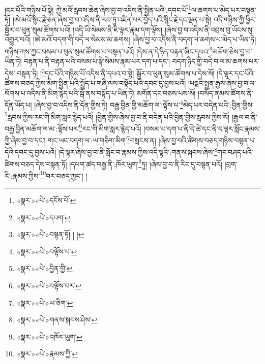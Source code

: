 །དང་པོའི་གཉིས་པོ་སྟེ། ཀྱེ་མའོ་རླབས་ཆེན་ཞེས་བྱ་བ་འདིས་ནི་སྦྱིན་པའི་:དབང་པོ་\footnote{«སྣར་»«པེ་»དངོས་པོ་}ལ་ཆགས་པ་མེད་པར་བསྟན་ཏོ། །ཨེ་མའོ་སྙིང་རྗེ་ཅན་ཞེས་བྱ་བ་འདིས་ནི་རབ་ཏུ་འཛིན་པར་བྱེད་པའི་སྙིང་རྗེ་དང་ལྡན་པ་སྟེ། འདི་གཉིས་ཀྱི་ཕྱིར་སྦྱོར་བ་ཕུན་སུམ་ཚོགས་པའོ། །འདི་ཡི་སེམས་ནི་ཇི་ལྟར་རྣམ་དག་ལྟོས། །ཞེས་བྱ་བ་འདིས་ནི་འབྲས་བུ་ཡོངས་སུ་འགྱུར་བའོ། །ཨེ་མའོ་བདག་གི་བདེ་ལ་སེམས་མ་ཆགས། །ཞེས་བྱ་བ་འདིས་ནི་བདག་ལ་ཆགས་པ་མེད་པ་ཡིན་ཏེ། གཉིས་ཀས་ཀྱང་བསམ་པ་ཕུན་སུམ་ཚོགས་པ་བསྟན་པའོ། །དེས་ན་དེ་ཉིད་བརྟན་ཞིང་དཔའ་\footnote{«སྣར་»«པེ་»དཔག་}མཆོག་ཅེས་བྱ་བ་ཡིན་ཏེ། བརྟན་པ་ནི་བརྟན་པའི་བསམ་པ་སྟེ་སེམས་རྣམ་པར་དག་པ་དང་། བདག་ཉིད་གྱི་བདེ་བ་ལ་མ་ཆགས་པར་དེས་:བསྟན་ཏེ། །\footnote{«སྣར་»«པེ་»བསྟན་ཏོ། ། །}དང་པོའི་གཉིས་པོ་འདིས་ནི་དཔའ་བ་སྟེ། སྦྱོར་བ་ཕུན་སུམ་ཚོགས་པ་དེས་སོ། །དེ་ལྟར་དང་པོའི་ཚིགས་བཅད་ཀྱིས་མིག་སྦྱིན་པའི་སྤྱོད་པ་གཞི་ལས་བསྟོད་པའི་དབང་དུ་བྱས་པའོ། །པདྨའི་སྤྱན་རྒྱས་ཞེས་བྱ་བ་ལ་སོགས་པ་འདིས་ནི་མིག་རྙེད་པའི་སྒོ་ནས་བསྟོད་པ་ཡིན་ཏེ། མགོན་དང་བཅས་པས་སོ། །བསོད་ནམས་ཚོགས་ནི་དོན་ཡོད་པ། །ཞེས་བྱ་བ་འདིས་ནི་དོན་གྱིས་ཏེ། བརྒྱ་བྱིན་གྱི་མཆོག་ལ་:ལྟོས་པ་\footnote{«སྣར་»«པེ་»བལྟོས་པ་}མེད་པར་བདེན་པའི་:བྱིན་གྱིས་\footnote{«སྣར་»«པེ་»བྱིན་གྱི་}རླབས་ཀྱིས་རང་གི་མིག་སླར་རྙེད་པའོ། །བྱིན་གྱིས་ཞེས་བྱ་བ་ནི་བདེན་པའི་བྱིན་གྱིས་རླབས་ཀྱིས་སོ། །རྒྱལ་བ་ནི་བརྒྱ་བྱིན་མཆོག་ལ་མ་:ལྟོས་པར་\footnote{«སྣར་»«པེ་»བལྟོས་པར་}རང་གི་མིག་སླར་རྙེད་པའོ། །བསམ་པ་དག་པ་ནི་དེ་ཚེ་དང་ནི་ད་ལྟར་སློང་རྣམས་ཀྱི་ཞེས་བྱ་བ་དང་། གང་ཡང་བདག་ལ་:ཡ་གཅིག་མིག་\footnote{«སྣར་»«པེ་»ཡ་ཅིག་}བསླངས་ན། །ཞེས་བྱ་བའི་ཚིགས་བཅད་གཉིས་བསྟན་པ་དེའི་དབང་དུ་བྱས་པའོ། །དེ་ལྟར་ཞེས་བྱ་བ་ནི་སློང་བ་རྣམས་ཀྱིས་འདི་ལྟའི་:གནས་སྐབས་ཞེས་\footnote{«སྣར་»«པེ་»གནས་སྐབས་ཤེས་}གང་བཤད་པའི་ཚིགས་བཅད་དེས་བསྟན་ཏོ། །དཔག་ཚད་བརྒྱ་ནི་:ཁོར་ཡུག་\footnote{«སྣར་»«པེ་»འཁོར་ཡུག་}ཏུ། །ཞེས་བྱ་བ་ནི་རིང་དུ་བསྟན་པའོ། །བྲག་རི་:རྣམས་ཀྱིས་\footnote{«སྣར་»«པེ་»རྣམས་ཀྱི་}བར་བཅད་ཀྱང་། །
